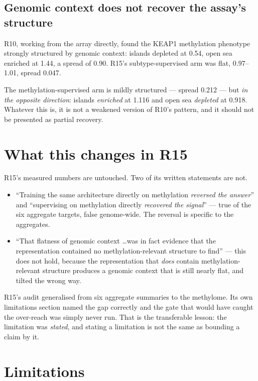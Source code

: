 \documentclass[11pt,a4paper]{article}
\begin{document}
\subsection{Genomic context does not recover the assay's structure}

R10, working from the array directly, found the KEAP1 methylation phenotype strongly structured
by genomic context: islands depleted at 0.54, open sea enriched at 1.44, a spread of 0.90. R15's
subtype-supervised arm was flat, 0.97--1.01, spread 0.047.

The methylation-supervised arm is mildly structured --- spread 0.212 --- but \emph{in the opposite
direction}: islands \emph{enriched} at 1.116 and open sea \emph{depleted} at 0.918. Whatever this
is, it is not a weakened version of R10's pattern, and it should not be presented as partial
recovery.

\section{What this changes in R15}

R15's measured numbers are untouched. Two of its written statements are not.

\begin{itemize}[leftmargin=1.3em,itemsep=3pt]
\item ``Training the same architecture directly on methylation \emph{reversed the answer}'' and
      ``supervising on methylation directly \emph{recovered the signal}'' --- true of the six
      aggregate targets, false genome-wide. The reversal is specific to the aggregates.
\item ``That flatness of genomic context \ldots was in fact evidence that the representation
      contained no methylation-relevant structure to find'' --- this does not hold, because the
      representation that \emph{does} contain methylation-relevant structure produces a genomic
      context that is still nearly flat, and tilted the wrong way.
\end{itemize}

R15's audit generalised from six aggregate summaries to the methylome. Its own limitations
section named the gap correctly and the gate that would have caught the over-reach was simply
never run. That is the transferable lesson: the limitation was \emph{stated}, and stating a
limitation is not the same as bounding a claim by it.

\section{Limitations}
\end{document}
